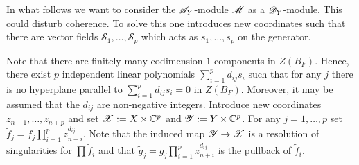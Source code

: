 In what follows we want to consider the $\mathscr{A}_Y$-module $\mathscr{M}$ as a $\mathscr{D}_Y$-module.
This could disturb coherence.
To solve this one introduces new coordinates such that there are vector fields $\mathcal{S}_1,\ldots, \mathcal{S}_p$ which acts as $s_1,\ldots,s_p$ on the generator.

Note that there are finitely many codimension $1$ components in $Z(B_F)$.
Hence, there exist $p$ independent linear polynomials $\sum_{i=1}^p d_{ij}s_i$ such that for any $j$ there is no hyperplane parallel to $\sum_{i=1}^p d_{ij}s_i = 0$ in $Z(B_F)$.
Moreover, it may be assumed that the $d_{ij}$ are non-negative integers.
Introduce new coordinates $z_{n+1}, \ldots,z_{n+p}$ and set $\mathscr{X}:= X\times \mathbb{C}^p$ and $\mathscr{Y} := Y\times \mathbb{C}^p$.
For any $j=1,\ldots, p$ set $\widetilde{f}_j = f_j\prod_{i=1}^p z_{n+i}^{d_{ij}}$.
Note that the induced map $\mathscr{Y} \to \mathscr{X}$ is a resolution of singularities for $\prod \widetilde{f}_i$ and that $\widetilde{g}_j = g_j\prod_{i=1}^p z_{n+i}^{d_{ij}}$ is the pullback of $\widetilde{f}_i$.

